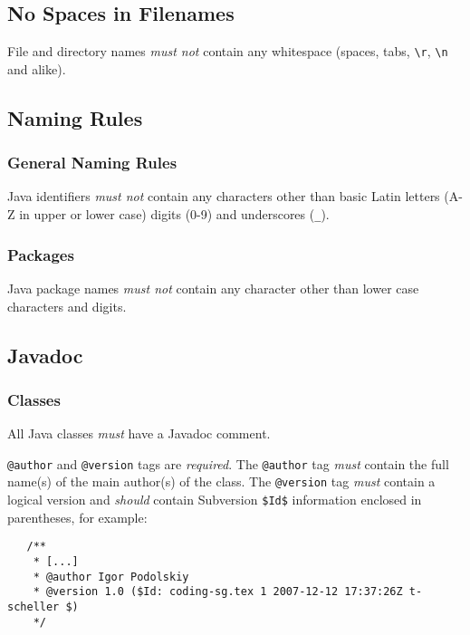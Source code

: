 \documentclass[a4paper,12pt,liststotoc,DIV12]{scrartcl}
\begin{document}
\subsection{No Spaces in Filenames}
File and directory names \emph{must not} contain any whitespace (spaces, tabs,
\verb!\r!, \verb!\n! and alike).

\subsection{Naming Rules}
\label{sec:general:naming-rules}

\subsubsection{General Naming Rules}
\label{sec:general-naming-rules}
Java identifiers \emph{must not} contain any characters other than basic Latin
letters (A-Z in upper or lower case) digits (0-9) and underscores
(\texttt{\_}).

\subsubsection{Packages}
\label{sec:naming:packages}
Java package names \emph{must not} contain any character other than lower
case characters and digits.

\subsection{Javadoc}
\label{sec:general:javadoc}

\subsubsection{Classes}
\label{sec:general:javadoc:classes}
All Java classes \emph{must} have a Javadoc comment.

\texttt{@author} and \texttt{@version} tags are \emph{required}. The
\texttt{@author} tag \emph{must} contain the full name(s) of the main author(s)
of the class. The \texttt{@version} tag \emph{must} contain a logical version
and \emph{should} contain Subversion \texttt{\$Id\$} information enclosed in
parentheses, for example:

\begin{verbatim}
   /**
    * [...]
    * @author Igor Podolskiy
    * @version 1.0 ($Id: coding-sg.tex 1 2007-12-12 17:37:26Z t-scheller $) 
    */
\end{verbatim}
\end{document}
